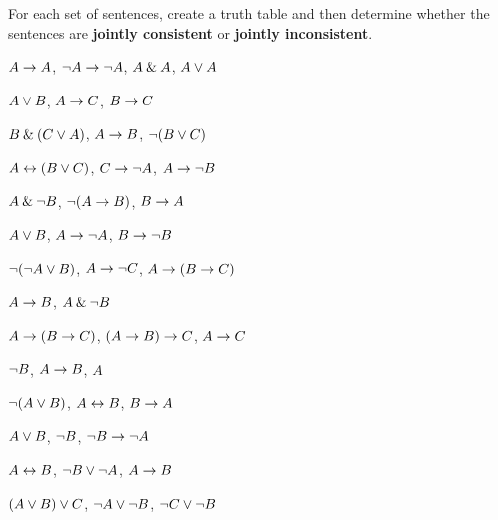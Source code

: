 \problempart
\label{pr.TT.consistent}
For each set of sentences, create a truth table and then determine whether the sentences are \textbf{jointly consistent} or \textbf{jointly inconsistent}.
\begin{earg}
\item $A\rightarrow A$, ${\neg} A \rightarrow {\neg} A$, $A\mathbin{\&} A$, $A\vee A$ %
\item $A\vee B$, $A\rightarrow C$, $B\rightarrow C$ %
\item $B\mathbin{\&}(C\vee A)$, $A\rightarrow B$, ${\neg}(B\vee C)$  %
\item $A\leftrightarrow(B\vee C)$, $C\rightarrow {\neg} A$, $A\rightarrow {\neg} B$ %

\item $A \mathbin{\&} {\neg} B$, ${\neg}(A \rightarrow B)$, $B \rightarrow A$\vspace{.5ex} %
\item $A \vee B$, $A \rightarrow {\neg} A$, $B \rightarrow {\neg} B$ \vspace{.5ex}%
\item ${\neg}({\neg} A \vee B) $, $A \rightarrow {\neg} C$, $A \rightarrow (B \rightarrow C)$\vspace{.5ex} %
\item $A \rightarrow B$, $A \mathbin{\&} {\neg} B$\vspace{.5ex} %
\item $A \rightarrow (B \rightarrow C)$, $(A \rightarrow B) \rightarrow C$, $A \rightarrow C$\vspace{.5ex} %

\item ${\neg} B$, $A \rightarrow B$, $A$ \vspace{.5ex}%
\item ${\neg}(A \vee B)$, $A \leftrightarrow B$, $B \rightarrow A$\vspace{.5ex} %
\item $A \vee B$, ${\neg} B$, ${\neg} B \rightarrow {\neg} A$\vspace{.5ex} %
\item $A \leftrightarrow B$, ${\neg} B \vee {\neg} A$, $A \rightarrow B$\vspace{.5ex} %
\item $(A \vee B) \vee C$, ${\neg} A \vee {\neg} B$, ${\neg} C \vee {\neg} B$\vspace{.5ex} %
\end{earg}

\newpage

